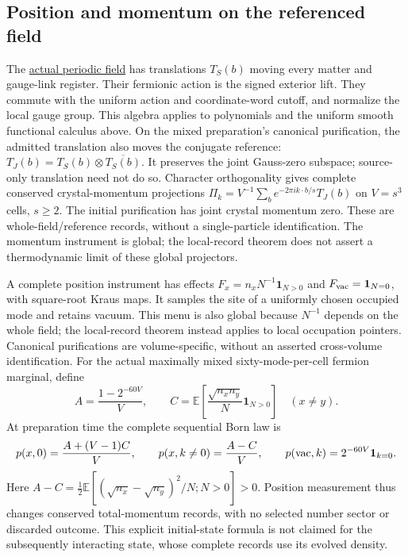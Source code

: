\subsection{Position and momentum on the referenced field}

The \href{https://github.com/FloatingPragma/observer-patch-holography/blob/main/model/particle_joint_translation_readout/PROOF.md}{actual periodic field}
has translations $T_S(b)$ moving every matter and gauge-link register.
Their fermionic action is the signed exterior lift. They commute with
the uniform action and coordinate-word cutoff, and normalize the local
gauge group. This algebra applies to polynomials and the uniform smooth
functional calculus above. On the mixed preparation's canonical
purification, the admitted translation also moves the conjugate reference:
$T_J(b)=T_S(b)\otimes\overline{T_S(b)}$. It preserves the joint
Gauss-zero subspace; source-only translation need not do so. Character
orthogonality gives complete conserved crystal-momentum projections
$\Pi_k=V^{-1}\sum_b e^{-2\pi i k\cdot b/s}T_J(b)$ on $V=s^3$ cells, $s\ge2$.
The initial purification has joint crystal momentum zero. These are
whole-field/reference records, without a single-particle identification.
The momentum instrument is global; the local-record theorem does not
assert a thermodynamic limit of these global projectors.

A complete position instrument has effects
$F_x=n_xN^{-1}\mathbf1_{N>0}$ and $F_{\rm vac}=\mathbf1_{N=0}$,
with square-root Kraus maps. It samples the site of a uniformly chosen
occupied mode and retains vacuum. This menu is also global because
$N^{-1}$ depends on the whole field; the local-record theorem instead
applies to local occupation pointers. Canonical purifications are
volume-specific, without an asserted cross-volume identification.
For the actual maximally mixed
sixty-mode-per-cell fermion marginal, define
\[
 A=\frac{1-2^{-60V}}{V},\qquad
 C=\mathbb E\left[\frac{\sqrt{n_xn_y}}{N}\mathbf1_{N>0}\right]
 \quad(x\ne y).
\]
At preparation time the complete sequential Born law is
\[
 p(x,0)=\frac{A+(V-1)C}{V},\qquad
 p(x,k\ne0)=\frac{A-C}{V},\qquad
 p({\rm vac},k)=2^{-60V}\mathbf1_{k=0}.
\]
Here $A-C=\tfrac12\mathbb E[(\sqrt{n_x}-\sqrt{n_y})^2/N;
N>0]>0$. Position measurement thus changes conserved total-momentum
records, with no selected number sector or discarded outcome.
This explicit initial-state formula is not claimed for the subsequently
interacting state, whose complete records use its evolved density.


